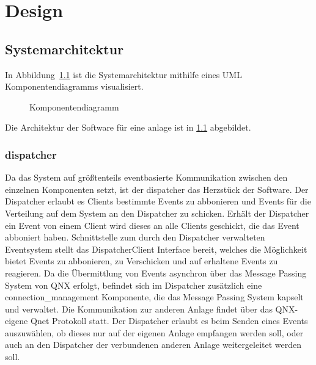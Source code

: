 \chapter{Design}\label{ch:design}



\section{Systemarchitektur}\label{sec:systemarchitektur}


In Abbildung~\ref{fig:cmp} ist die Systemarchitektur mithilfe eines UML Komponentendiagramms
visualisiert.

\begin{figure}[h]
    \centering
    \caption{Komponentendiagramm}
    \label{fig:cmp}
\end{figure}

Die Architektur der Software für eine \gls{anlage} ist in \ref{fig:cmp} abgebildet.

\subsection{dispatcher}\label{subsec:dispatcher}
Da das System auf größtenteils eventbasierte Kommunikation zwischen den einzelnen Komponenten setzt,
ist der dispatcher das Herzstück der Software. Der Dispatcher erlaubt es Clients bestimmte Events zu abbonieren
und Events für die Verteilung auf dem System an den Dispatcher zu schicken. Erhält der Dispatcher ein Event von einem
Client wird dieses an alle Clients geschickt, die das Event abboniert haben. Schnittstelle zum durch den Dispatcher
verwalteten Eventsystem stellt das DispatcherClient Interface bereit, welches die Möglichkeit bietet Events zu abbonieren,
zu Verschicken und auf erhaltene Events zu reagieren. Da die Übermittlung von Events asynchron über das Message Passing System
von QNX erfolgt, befindet sich im Dispatcher zusätzlich eine connection\_management Komponente, die das Message Passing System
kapselt und verwaltet. Die Kommunikation zur anderen Anlage findet über das QNX-eigene Qnet Protokoll statt.
Der Dispatcher erlaubt es beim Senden eines Events auszuwählen, ob dieses nur auf der eigenen Anlage empfangen werden soll,
oder auch an den Dispatcher der verbundenen anderen Anlage weitergeleitet werden soll.


